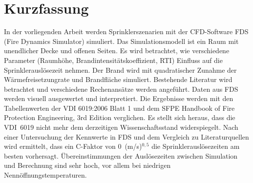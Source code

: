 \chapter{Kurzfassung}

In der vorliegenden Arbeit werden Sprinklerszenarien mit der CFD-Software FDS (Fire Dynamics Simulator) simuliert. Das Simulationsmodell ist ein Raum mit unendlicher Decke und offenen Seiten. Es wird betrachtet, wie verschiedene Parameter (Raumhöhe, Brandintensitätskoeffizient, RTI) Einfluss auf die Sprinklerauslösezeit nehmen. Der Brand wird mit quadratischer Zunahme der Wärmefreisetzungrate und Brandfläche simuliert. 
Bestehende Literatur wird betrachtet und verschiedene Rechenansätze werden angeführt. Daten aus FDS werden visuell ausgewertet und interpretiert. 
Die Ergebnisse werden mit den Tabellenwerten der VDI 6019:2006 Blatt 1 und dem SFPE Handbook of Fire Protection Engineering, 3rd Edition verglichen. Es stellt sich heraus, dass die VDI~6019 nicht mehr dem derzeitigen Wissenschaftsstand widerspiegelt. Nach einer Untersuchung der Kennwerte in FDS und dem Vergleich zu Literaturquellen wird ermittelt, dass ein C-Faktor von 0~(m/s)$^{0,5}$ die Sprinklerauslösezeiten am besten vorhersagt. Übereinstimmungen der Auslösezeiten zwischen Simulation und Berechnung sind sehr hoch, vor allem bei niedrigen Nennöffnungstemperaturen.  










